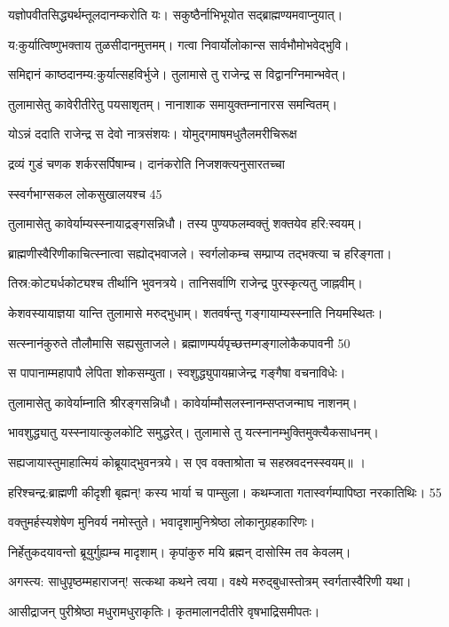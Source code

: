  
यज्ञोपवीतसिद्ध्यर्थम्तूलदानम्करोति यः।
 सकुष्ठैर्नाभिभूयोत सद्ब्राह्मण्यमवाप्नुयात्।

 य:कुर्यात्विष्णुभक्ताय तुळसीदानमुत्तमम्।
 गत्वा निवार्योलोकान्स सार्वभौमोभवेद्भुवि।

 समिद्दानं काष्ठदानम्य:कुर्यात्सहविर्भुजे।
 तुलामासे तु राजेन्द्र स विद्वानग्निमान्भवेत्।

 तुलामासेतु कावेरीतीरेतु पयसाशृतम्।
 नानाशाक समायुक्तम्नानारस समन्वितम्।

 योऽन्नं ददाति राजेन्द्र स देवो नात्रसंशयः।
 योमुद्गमाषमधुतैलमरीचिरूक्ष

द्रव्यं गुडं चणक शर्करसर्पिषाम्च।
 दानंकरोति निजशक्त्यनुसारतच्चा

स्स्वर्गभाग्सकल लोकसुखालयश्च 45

 तुलामासेतु कावेर्याम्यस्स्नायाद्रङ्गसन्निधौ।
 तस्य पुण्यफलम्वक्तुं शक्तयेव हरि:स्वयम्।

 ब्राह्मणीस्वैरिणीकाचित्स्नात्वा सह्योद्भवाजले।
 स्वर्गलोकम्च सम्प्राप्य तद्भक्त्या च हरिङ्गता।

 तिस्र:कोट्यर्धकोट्यश्च तीर्थानि भुवनत्रये।
 तानिसर्वाणि राजेन्द्र पुरस्कृत्यतु जाह्नवीम्।

 केशवस्यायाज्ञया यान्ति तुलामासे मरुद्भुधाम्।
 शतवर्षन्तु गङ्गायाम्यस्स्नाति नियमस्थितः।

 सत्स्नानंकुरुते तौलौमासि सह्यसुताजले।
ब्रह्माणम्पर्यपृच्छत्तम्गङ्गालोकैकपावनी 50

 स पापानाम्महापापै लेपिता शोकसम्युता।
 स्वशुद्ध्युपायम्राजेन्द्र गङ्गैषा वचनाविधेः।

 तुलामासेतु कावेर्याम्नाति श्रीरङ्गसन्निधौ।
 कावेर्याम्मौसलस्नानम्सप्तजन्माघ नाशनम्।

 भावशुद्ध्यातु यस्स्नायात्कुलकोटि समुद्धरेत्।
 तुलामासे तु यत्स्नानम्भुक्तिमुक्त्यैकसाधनम्।

 सह्यजायास्तुमाहात्मियं कोब्रूयाद्भुवनत्रये।
 स एव वक्ताश्रोता च सहस्रवदनस्स्वयम्॥ ।

 हरिश्चन्द्र:ब्राह्मणी कीदृशी बृह्मन्! कस्य भार्या च पाम्सुला।
 कथम्जाता गतास्वर्गम्पापिष्ठा नरकातिथिः। 55

  वक्तुमर्हस्यशेषेण मुनिवर्य नमोस्तुते।
 भवादृशामुनिश्रेष्ठा लोकानुग्रहकारिणः।

 निर्हेतुकदयावन्तो ब्रूयुर्गुह्यम्च मादृशाम्।
 कृपांकुरु मयि ब्रह्मन् दासोस्मि तव केवलम्।

अगस्त्य:
साधुपृष्ठम्महाराजन्! सत्कथा कथने त्वया।
 वक्ष्ये मरुद्बुधास्तोत्रम् स्वर्गतास्वैरिणी यथा।

 आसीद्राजन् पुरीश्रेष्ठा मधुरामधुराकृतिः।
 कृतमालानदीतीरे वृषभाद्रिसमीपतः।

